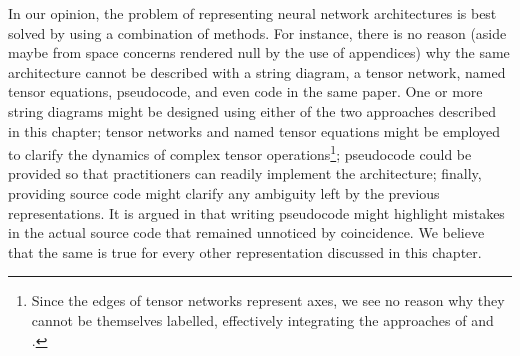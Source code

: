 \documentclass[11pt,a4paper,openright,twoside]{report}
\theoremstyle{plain}
\theoremstyle{definition}
\begin{document}
In our opinion, the problem of representing neural network architectures is best solved by using a combination of methods. For instance, there is no reason (aside maybe from space concerns rendered null by the use of appendices) why the same architecture cannot be described with a string diagram, a tensor network, named tensor equations, pseudocode, and even code in the same paper. One or more string diagrams might be designed using either of the two approaches described in this chapter; tensor networks and named tensor equations might be employed to clarify the dynamics of complex tensor operations\footnote{Since the edges of tensor networks represent axes, we see no reason why they cannot be themselves labelled, effectively integrating the approaches of \cite{xu2023graph} and \cite{chiang2021named}.}; pseudocode could be provided so that practitioners can readily implement the architecture; finally, providing source code might clarify any ambiguity left by the previous representations. It is argued in \cite{phuong2022formal} that writing pseudocode might highlight mistakes in the actual source code that remained unnoticed by coincidence. We believe that the same is true for every other representation discussed in this chapter.


\clearpage{\pagestyle{empty}\cleardoublepage}
\end{document}
